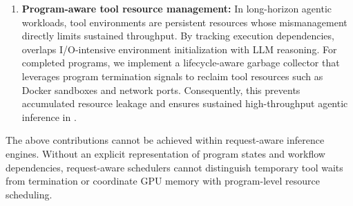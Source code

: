 \begin{enumerate}[itemsep=0.0pt,topsep=0pt,leftmargin=*]
    \item \textbf{Program-aware tool resource management:} In long-horizon agentic workloads, tool environments are persistent resources whose mismanagement directly limits sustained throughput. By tracking execution dependencies, \ouralg overlaps I/O-intensive environment initialization with LLM reasoning.
    For completed programs, we implement a lifecycle-aware garbage collector
    that leverages program termination signals to reclaim tool resources such as Docker sandboxes and network ports.
    Consequently, this prevents accumulated resource leakage and ensures sustained high-throughput agentic inference in \ouralg.

\end{enumerate}

The above contributions cannot be achieved within request-aware inference engines. Without an explicit representation of program states and workflow dependencies, request-aware schedulers cannot distinguish temporary tool waits from termination or coordinate GPU memory with program-level resource scheduling.


